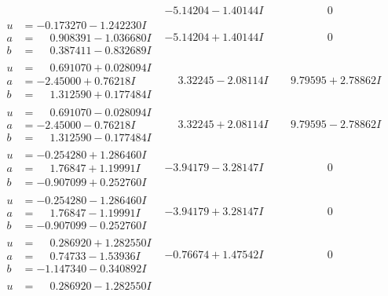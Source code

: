 \documentclass[1p]{elsarticle_modified}
\theoremstyle{definition}
\begin{document}
$$\begin{array}{c|c|c}
 & -5.14204 - 1.40144 I & \phantom{-0.000000 } 0 \\ \hline\begin{aligned}
u &= -0.173270 - 1.242230 I \\
a &= \phantom{-}0.908391 - 1.036680 I \\
b &= \phantom{-}0.387411 - 0.832689 I\end{aligned}
 & -5.14204 + 1.40144 I & \phantom{-0.000000 } 0 \\ \hline\begin{aligned}
u &= \phantom{-}0.691070 + 0.028094 I \\
a &= -2.45000 + 0.76218 I \\
b &= \phantom{-}1.312590 + 0.177484 I\end{aligned}
 & \phantom{-}3.32245 - 2.08114 I & \phantom{-}9.79595 + 2.78862 I \\ \hline\begin{aligned}
u &= \phantom{-}0.691070 - 0.028094 I \\
a &= -2.45000 - 0.76218 I \\
b &= \phantom{-}1.312590 - 0.177484 I\end{aligned}
 & \phantom{-}3.32245 + 2.08114 I & \phantom{-}9.79595 - 2.78862 I \\ \hline\begin{aligned}
u &= -0.254280 + 1.286460 I \\
a &= \phantom{-}1.76847 + 1.19991 I \\
b &= -0.907099 + 0.252760 I\end{aligned}
 & -3.94179 - 3.28147 I & \phantom{-0.000000 } 0 \\ \hline\begin{aligned}
u &= -0.254280 - 1.286460 I \\
a &= \phantom{-}1.76847 - 1.19991 I \\
b &= -0.907099 - 0.252760 I\end{aligned}
 & -3.94179 + 3.28147 I & \phantom{-0.000000 } 0 \\ \hline\begin{aligned}
u &= \phantom{-}0.286920 + 1.282550 I \\
a &= \phantom{-}0.74733 - 1.53936 I \\
b &= -1.147340 - 0.340892 I\end{aligned}
 & -0.76674 + 1.47542 I & \phantom{-0.000000 } 0 \\ \hline\begin{aligned}
u &= \phantom{-}0.286920 - 1.282550 I \\

\end{aligned}
\end{array}$$
\end{document}
